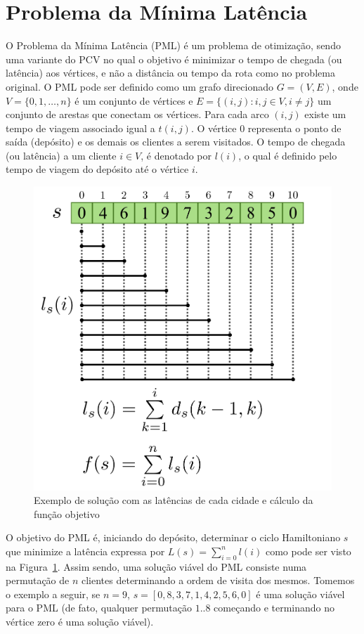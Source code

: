 \section{Problema da Mínima Latência}\label{sec:mlp}

O Problema da Mínima Latência (PML) é um problema de otimização, sendo uma variante do PCV no qual o objetivo é minimizar o tempo de chegada (ou latência) aos vértices, e não a distância ou tempo da rota como no problema original.
O PML pode ser definido como um grafo direcionado $G=(V,E)$, onde $V=\{0,1,\dots,n\}$ é um conjunto de vértices e $E = \{(i, j) : i, j \in V, i \ne j \}$ um conjunto de arestas que conectam os vértices.
Para cada arco $(i,j)$ existe um tempo de viagem associado igual a $t(i,j)$. O vértice 0 representa o ponto de saída (depósito) e os demais os clientes a serem visitados.
O tempo de chegada (ou latência) a um cliente $i \in V$, é denotado por $l(i)$, o qual é definido pelo tempo de viagem do depósito até o vértice $i$.

\begin{figure}[htpb]
    \centering
    \includegraphics[width=0.6\linewidth]{figuras/pml/mlp}
    \caption{Exemplo de solução com as latências de cada cidade e cálculo da função objetivo}
    \label{fig:pmlDiagramaFormulas}
\end{figure}

O objetivo do PML é, iniciando do depósito, determinar o ciclo Hamiltoniano $s$ que minimize a latência expressa por $L(s)=\sum_{i=0}^{n} l(i)$ como pode ser visto na Figura~\ref{fig:pmlDiagramaFormulas}.
Assim sendo, uma solução viável do PML consiste numa permutação de $n$ clientes determinando a ordem de visita dos mesmos. Tomemos o exemplo a seguir, se $n=9$,  $s=[0,8,3,7,1,4,2,5,6,0]$ é uma solução viável para o PML (de fato, qualquer permutação $1..8$ começando e terminando no vértice zero é uma solução viável).

